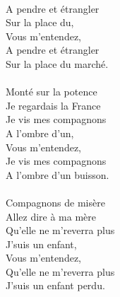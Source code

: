 {\\A pendre et étrangler
\\Sur la place du,
\\Vous m'entendez,
\\A pendre et étrangler
\\Sur la place du marché.
\\\\Monté sur la potence
\\Je regardais la France
\\Je vis mes compagnons
\\A l'ombre d'un,
\\Vous m'entendez,
\\Je vis mes compagnons
\\A l'ombre d'un buisson.
\\\\Compagnons de misère
\\Allez dire à ma mère
\\Qu'elle ne m'reverra plus
\\J'suis un enfant,
\\Vous m'entendez,
\\Qu'elle ne m'reverra plus
\\J'suis un enfant perdu.}
\\\\
\\
\breakpage
